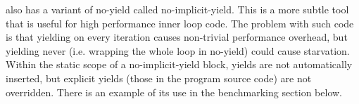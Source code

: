 \documentclass[9pt,preprint]{sigplanconf-2}
\begin{document}
\charcoal{} also has a variant of no-yield called no-implicit-yield.
This is a more subtle tool that is useful for high performance inner loop code.
The problem with such code is that yielding on every iteration causes non-trivial performance overhead, but yielding never (i.e. wrapping the whole loop in no-yield) could cause starvation.
Within the static scope of a no-implicit-yield block, yields are not automatically inserted, but explicit yields (those in the program source code) are not overridden.
There is an example of its use in the benchmarking section below.




\end{document}

